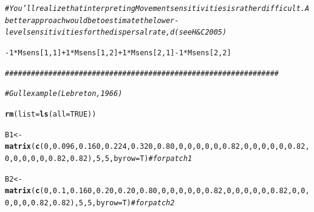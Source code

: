 \documentclass{article}\usepackage[]{graphicx}\usepackage[]{color}
\makeatletter
\newcommand{\hlnum}[1]{\textcolor[rgb]{0.686,0.059,0.569}{#1}}%
\newcommand{\hlcom}[1]{\textcolor[rgb]{0.678,0.584,0.686}{\textit{#1}}}%
\newcommand{\hlopt}[1]{\textcolor[rgb]{0,0,0}{#1}}%
\newcommand{\hlstd}[1]{\textcolor[rgb]{0.345,0.345,0.345}{#1}}%
\newcommand{\hlkwb}[1]{\textcolor[rgb]{0.69,0.353,0.396}{#1}}%
\newcommand{\hlkwc}[1]{\textcolor[rgb]{0.333,0.667,0.333}{#1}}%
\newcommand{\hlkwd}[1]{\textcolor[rgb]{0.737,0.353,0.396}{\textbf{#1}}}%
\newenvironment{kframe}{%
 \def\at@end@of@kframe{}%
 \ifinner\ifhmode%
  \def\at@end@of@kframe{\end{minipage}}%
  \begin{minipage}{\columnwidth}%
 \fi\fi%
 \def\FrameCommand##1{\hskip\@totalleftmargin \hskip-\fboxsep
 \colorbox{shadecolor}{##1}\hskip-\fboxsep
     \hskip-\linewidth \hskip-\@totalleftmargin \hskip\columnwidth}%
 \MakeFramed {\advance\hsize-\width
   \@totalleftmargin\z@ \linewidth\hsize
   \@setminipage}}%
 {\par\unskip\endMakeFramed%
 \at@end@of@kframe}
\newenvironment{knitrout}{}{} %
\makeatother
\begin{document}
\begin{knitrout}
\begin{kframe}
{\ttfamily\noindent\bfseries\color{errorcolor}{\#\# Error in eval(expr, envir, enclos): object 'Asens' not found}}\begin{alltt}
\hlcom{# You'll realize that interpreting Movement sensitivities is rather difficult. A better approach would be to estimate the lower-level sensitivities for the dispersal rate, d (see H&C 2005)}

\hlopt{-}\hlnum{1} \hlopt{*} \hlstd{Msens[}\hlnum{1}\hlstd{,}\hlnum{1}\hlstd{]} \hlopt{+} \hlnum{1} \hlopt{*} \hlstd{Msens[}\hlnum{1}\hlstd{,}\hlnum{2}\hlstd{]} \hlopt{+} \hlnum{1} \hlopt{*} \hlstd{Msens[}\hlnum{2}\hlstd{,}\hlnum{1}\hlstd{]} \hlopt{-} \hlnum{1} \hlopt{*} \hlstd{Msens[}\hlnum{2}\hlstd{,}\hlnum{2}\hlstd{]}
\end{alltt}


{\ttfamily\noindent\bfseries\color{errorcolor}{\#\# Error in eval(expr, envir, enclos): object 'Msens' not found}}\begin{alltt}
\hlcom{###############################################################}


\hlcom{# Gull example (Lebreton, 1966)}

\hlkwd{rm}\hlstd{(}\hlkwc{list}\hlstd{=}\hlkwd{ls}\hlstd{(}\hlkwc{all}\hlstd{=}\hlnum{TRUE}\hlstd{))}

\hlstd{B1}\hlkwb{<-}\hlkwd{matrix}\hlstd{(}\hlkwd{c}\hlstd{(}\hlnum{0}\hlstd{,}\hlnum{0.096}\hlstd{,}\hlnum{0.160}\hlstd{,}\hlnum{0.224}\hlstd{,}\hlnum{0.320}\hlstd{,}\hlnum{0.80}\hlstd{,}\hlnum{0}\hlstd{,}\hlnum{0}\hlstd{,}\hlnum{0}\hlstd{,}\hlnum{0}\hlstd{,}\hlnum{0}\hlstd{,}\hlnum{0.82}\hlstd{,}\hlnum{0}\hlstd{,}\hlnum{0}\hlstd{,}\hlnum{0}\hlstd{,}\hlnum{0}\hlstd{,}\hlnum{0}\hlstd{,}\hlnum{0.82}\hlstd{,}\hlnum{0}\hlstd{,}\hlnum{0}\hlstd{,}\hlnum{0}\hlstd{,}\hlnum{0}\hlstd{,}\hlnum{0}\hlstd{,}\hlnum{0.82}\hlstd{,}\hlnum{0.82}\hlstd{),}\hlnum{5}\hlstd{,}\hlnum{5}\hlstd{,}\hlkwc{byrow}\hlstd{=T)}    \hlcom{# for patch 1}

\hlstd{B2}\hlkwb{<-}\hlkwd{matrix}\hlstd{(}\hlkwd{c}\hlstd{(}\hlnum{0}\hlstd{,}\hlnum{0.1}\hlstd{,}\hlnum{0.160}\hlstd{,}\hlnum{0.20}\hlstd{,}\hlnum{0.20}\hlstd{,}\hlnum{0.80}\hlstd{,}\hlnum{0}\hlstd{,}\hlnum{0}\hlstd{,}\hlnum{0}\hlstd{,}\hlnum{0}\hlstd{,}\hlnum{0}\hlstd{,}\hlnum{0.82}\hlstd{,}\hlnum{0}\hlstd{,}\hlnum{0}\hlstd{,}\hlnum{0}\hlstd{,}\hlnum{0}\hlstd{,}\hlnum{0}\hlstd{,}\hlnum{0.82}\hlstd{,}\hlnum{0}\hlstd{,}\hlnum{0}\hlstd{,}\hlnum{0}\hlstd{,}\hlnum{0}\hlstd{,}\hlnum{0}\hlstd{,}\hlnum{0.82}\hlstd{,}\hlnum{0.82}\hlstd{),}\hlnum{5}\hlstd{,}\hlnum{5}\hlstd{,}\hlkwc{byrow}\hlstd{=T)} \hlcom{# for patch 2}


\end{alltt}
\end{kframe}
\end{knitrout}
\end{document}
